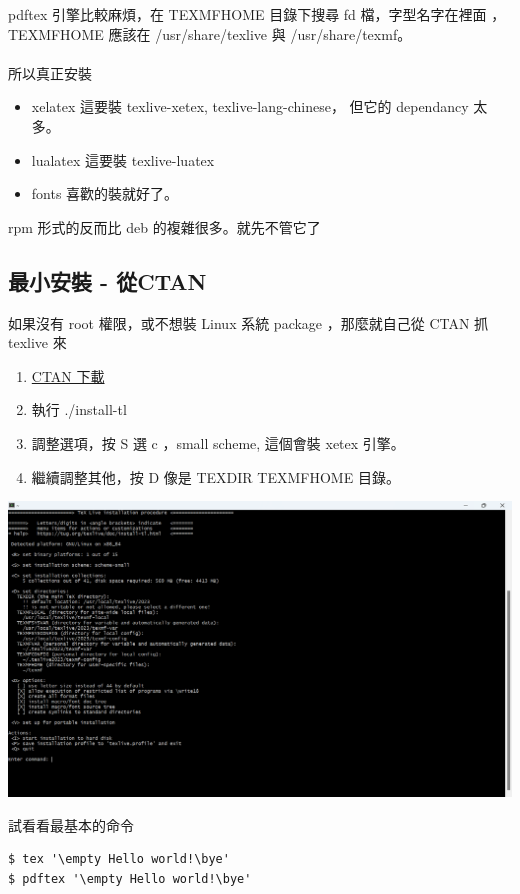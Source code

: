 pdftex 引擎比較麻煩，在 TEXMFHOME 目錄下搜尋 fd 檔，字型名字在裡面
，TEXMFHOME 應該在 /usr/share/texlive 與 /usr/share/texmf。
\\\\
所以真正安裝
\begin{itemize}
\item xelatex 這要裝 texlive-xetex, texlive-lang-chinese，
但它的 dependancy 太多。
\item lualatex 這要裝 texlive-luatex
\item fonts 喜歡的裝就好了。
\end{itemize}
rpm 形式的反而比 deb 的複雜很多。就先不管它了

\subsection{最小安裝 - 從CTAN}
如果沒有 root 權限，或不想裝 Linux 系統 package ，那麼就自己從 CTAN 抓 texlive 來
\begin{enumerate}
\item \href {http://mirror.ctan.org/systems/texlive/tlnet/install-tl-unx.tar.gz}{CTAN 下載}
\item 執行 ./install-tl
\item 調整選項，按 S 選 c ，small scheme, 這個會裝 xetex 引擎。
\item 繼續調整其他，按 D 像是 TEXDIR TEXMFHOME 目錄。
\end{enumerate}
\begin{center}
\includegraphics[width=\textwidth,height=0.6\textwidth]{images/texlive.png}
\end{center}
試看看最基本的命令
\begin{verbatim}
$ tex '\empty Hello world!\bye'
$ pdftex '\empty Hello world!\bye'
\end{verbatim}
